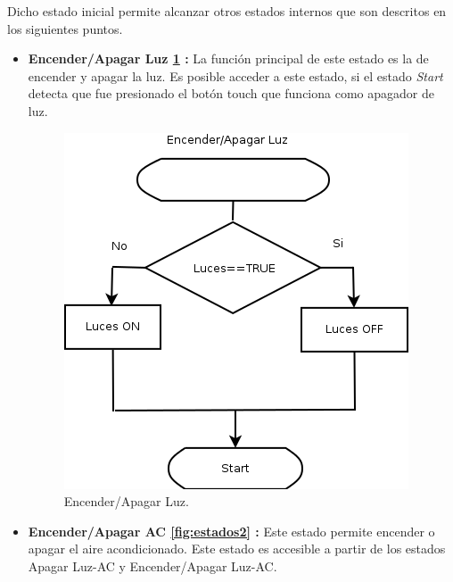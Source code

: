 \documentclass[journal]{IEEEtran}
\begin{document}
Dicho estado inicial permite alcanzar otros estados internos que son descritos en los siguientes puntos.

\begin{itemize}

	\item  \textbf{Encender/Apagar Luz \ref{fig:estados1} :} La función principal de este estado es la de encender y apagar la luz.
	Es posible acceder a este estado, si el estado \emph{Start} detecta que fue presionado el botón touch que funciona como apagador de luz.
\begin{figure}
\centering
\includegraphics[width=\columnwidth]{diagramas/Encender_apagar_luz.png}
\caption{Encender/Apagar Luz.}
\label{fig:estados1}
\end{figure}
	\item  \textbf{Encender/Apagar AC \ref{fig:estados2} :} Este estado permite encender o apagar el aire acondicionado.
	Este estado es accesible a partir de los estados Apagar Luz-AC y Encender/Apagar Luz-AC.
	

\end{itemize}
\end{document}
